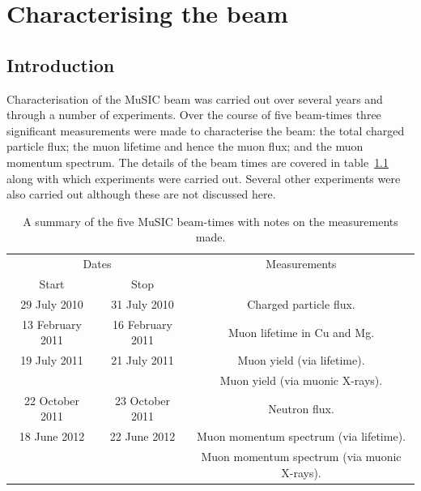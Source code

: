 \part{Characterising the beam} %
\label{prt:characterising_the_beam}
\chapter{Introduction} %
\label{cha:introduction}
Characterisation of the MuSIC beam was carried out over several years and through a number of experiments. Over the course of five beam-times three significant measurements were made to characterise the beam: the total charged particle flux; the muon lifetime and hence the muon flux; and the muon momentum spectrum. The details of the beam times are covered in table~\ref{tab:summary_music_beam_time} along with which experiments were carried out. Several other experiments were also carried out although these are not discussed here.
\begin{table}[htpb]
  \begin{center}
    \begin{tabular}{c|c|c}
      \multicolumn{2}{c|}{Dates}          & Measurements                                \\
      Start            & Stop             &                                             \\
      \hline                                                                             
      29 July 2010     & 31 July 2010     & Charged particle flux.                      \\
      13 February 2011 & 16 February 2011 & Muon lifetime in Cu and Mg.                 \\
      19 July 2011     & 21 July 2011     & Muon yield (via lifetime).                  \\
      &                  & Muon yield (via muonic X-rays).             \\
      22 October 2011  & 23 October 2011  & Neutron flux.                               \\
      18 June 2012     & 22 June 2012     & Muon momentum spectrum (via lifetime).      \\
      &                  & Muon momentum spectrum (via muonic X-rays). \\
    \end{tabular}
  \end{center}
  \caption{A summary of the five MuSIC beam-times with notes on the measurements made.}
  \label{tab:summary_music_beam_time}
\end{table}

